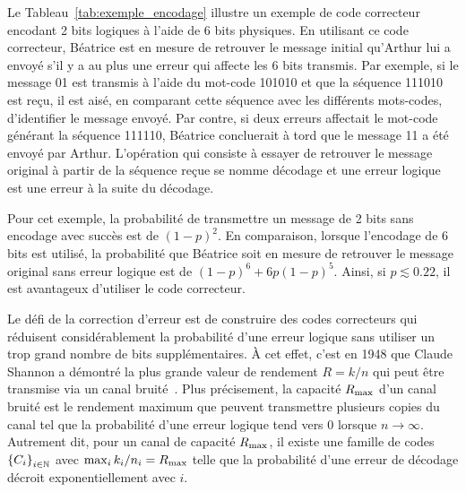 Le Tableau~\ref{tab:exemple_encodage} illustre un exemple de code correcteur
encodant 2 bits logiques à l'aide de 6 bits physiques.
En utilisant ce code correcteur,
Béatrice est en mesure de retrouver le message initial qu'Arthur lui a
envoyé s'il y a au plus une erreur qui affecte les 6 bits transmis. 
Par exemple, si le message 01 est transmis à l'aide du mot-code 
101010 et que la séquence 111010 est reçu, 
il est aisé, en comparant cette séquence avec les différents 
mots-codes, d'identifier le message envoyé. 
Par contre, 
si deux erreurs affectait le mot-code générant la séquence 111110, 
Béatrice concluerait à tord que le message 11 a été envoyé par Arthur.
L'opération qui consiste à essayer de retrouver le message original à partir
de la séquence reçue se nomme décodage 
et une erreur logique est une erreur à la suite du décodage.

Pour cet exemple,
la probabilité de transmettre un message de 2 bits sans encodage avec succès 
est de $(1 - p)^2$. 
En comparaison,
lorsque l'encodage de 6 bits est utilisé, 
la probabilité que Béatrice soit en mesure de retrouver le message original 
sans erreur logique est de $(1 - p)^6 + 6p(1 - p)^5$.
Ainsi, si $p \lesssim 0.22$, il est avantageux d'utiliser le code correcteur.

Le défi de la correction d'erreur est de construire des codes correcteurs 
qui réduisent considérablement la probabilité d'une erreur logique sans utiliser 
un trop grand nombre de bits supplémentaires.
À cet effet, c'est en 1948 que Claude Shannon a démontré la plus grande valeur 
de rendement $R = k/n$ qui peut être transmise 
via un canal bruité~\cite{shannon_mathematical_1948}.
Plus précisement,
la capacité $R_{\text{max}}$ d'un canal bruité est le rendement maximum 
que peuvent transmettre plusieurs copies du canal tel que la probabilité d'une 
erreur logique tend vers 0 lorsque $n \to \infty$.
Autrement dit,
pour un canal de capacité $R_{\text{max}}$, 
il existe une famille de codes $\qty{C_i}_{i\in\mathbb N}$ avec 
$\max_{i} k_i / n_i = R_{\text{max}}$ telle que la probabilité d'une erreur de 
décodage décroit exponentiellement avec $i$.

